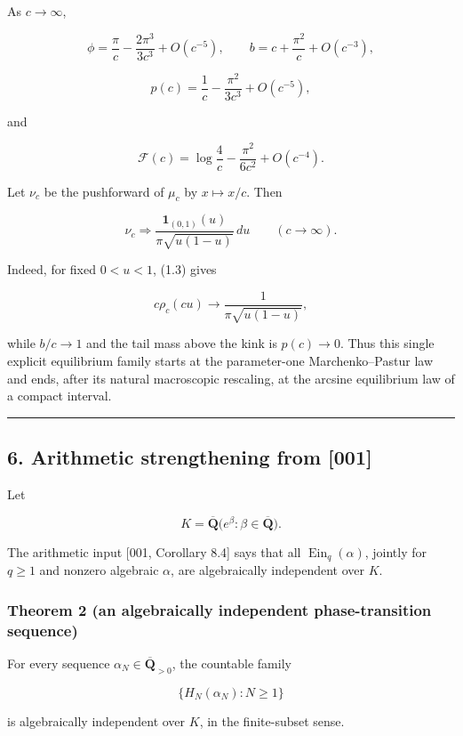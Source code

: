 \documentclass[11pt]{article}
\theoremstyle{keio}
\theoremstyle{definition}
\theoremstyle{remark}
\newcommand{\Ein}{\operatorname{Ein}}
\begin{document}
As \(c\to\infty\),

\[
\phi=\frac\pi c-\frac{2\pi^3}{3c^3}+O(c^{-5}),
\qquad
b=c+\frac{\pi^2}{c}+O(c^{-3}), \tag{DS-5.4}
\]

\[
p(c)=\frac1c-\frac{\pi^2}{3c^3}+O(c^{-5}), \tag{DS-5.5}
\]

and

\[
\mathcal F(c)=\log\frac4c-\frac{\pi^2}{6c^2}+O(c^{-4}). \tag{DS-5.6}
\]

Let \(\nu_c\) be the pushforward of \(\mu_c\) by \(x\mapsto x/c\). Then

\[
\boxed{
\nu_c\Longrightarrow
\frac{\mathbf1_{(0,1)}(u)}{\pi\sqrt{u(1-u)}}\,du
\qquad(c\to\infty).} \tag{DS-5.7}
\]

Indeed, for fixed \(0<u<1\), (1.3) gives

\[
c\rho_c(cu)\longrightarrow\frac1{\pi\sqrt{u(1-u)}},
\]

while \(b/c\to1\) and the tail mass above the kink is \(p(c)\to0\).
Thus this single explicit equilibrium family starts at the parameter-one
Marchenko--Pastur law and ends, after its natural macroscopic rescaling, at
the arcsine equilibrium law of a compact interval.

\begin{center}\rule{0.5\linewidth}{0.5pt}\end{center}

\subsection{6. Arithmetic strengthening from {[}001{]}}

Let

\[
K=\overline{\mathbf Q}
\bigl(e^\beta:\beta\in\overline{\mathbf Q}\bigr).
\]

The arithmetic input {[}001, Corollary 8.4{]} says that all
\(\Ein_q(\alpha)\), jointly for \(q\ge1\) and nonzero algebraic \(\alpha\),
are algebraically independent over \(K\).

\subsubsection{Theorem 2 (an algebraically independent phase-transition sequence)}

For every sequence \(\alpha_N\in\overline{\mathbf Q}_{>0}\), the countable
family

\[
\{H_N(\alpha_N):N\ge1\}
\]

is algebraically independent over \(K\), in the finite-subset sense.
\end{document}
